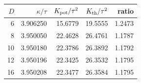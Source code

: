 \begin{tabular}{rrrrr}\toprule
$D$ & $\kappa/\tau$ & $K_{\rm pot}/\tau^2$ & $K_{\rm th}/\tau^2$ & ratio\\\midrule
6 & 3.906250 & 15.6779 & 19.5555 & 1.2473 \\
8 & 3.950050 & 22.4628 & 26.4761 & 1.1787 \\
10 & 3.950180 & 22.3786 & 26.3892 & 1.1792 \\
12 & 3.950196 & 22.3425 & 26.3532 & 1.1795 \\
16 & 3.950208 & 22.3477 & 26.3584 & 1.1795 \\
\bottomrule\end{tabular}
